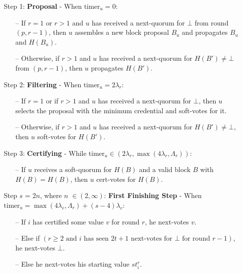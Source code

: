 \documentclass{article}
\begin{document}
    \begin{enumerate}

        \item[] Step 1: \textbf{Proposal} - When $\text{timer}_u = 0$:
        \begin{itemize}
            \item[--] If $r = 1$ or $r > 1$ and $u$ has received a next-quorum for $\bot$ from round $(p, r - 1)$, then $u$ assembles a new block proposal $B_u$ and propagates $B_u$ and $H(B_u)$.
            \item[--] Otherwise, if $r > 1$ and $u$ has received a next-quorum for $H(B') \neq \bot$ from $(p, r-1)$, then $u$ propagates $H(B')$.
        \end{itemize}

        \item[] Step 2: \textbf{Filtering} - When $\text{timer}_u = 2\lambda_r$:
        \begin{itemize}
            \item[--] If $r = 1$ or if $r > 1$ and $u$ has received a next-quorum for $\bot$, then $u$ selects the proposal with the minimum credential and soft-votes for it.
            \item[--] Otherwise, if $r > 1$ and $u$ has received a next-quorum for $H(B') \neq \bot$, then $u$ soft-votes for $H(B')$.
        \end{itemize}

        \item[] Step 3: \textbf{Certifying} - While $\text{timer}_u \in (2\lambda_r, \max(4\lambda_r, \Lambda_r))$:
        \begin{itemize}
            \item[--] If $u$ receives a soft-quorum for $H(B)$ and a valid block $B$ with $H(B) = H(B)$, then $u$ cert-votes for $H(B)$.
        \end{itemize}

        \item[] Step $s$ = 2$n$, where $n$ $\in (2, \infty)$: \textbf{First Finishing Step} - When $\text{timer}_u = \max(4\lambda_r, \Lambda_r) + (s-4)\lambda_r$:
        \begin{itemize}
            \item[--] If $i$ has certified some value $v$ for round $r$, he next-votes $v$.
            \item[--] Else if $(r \geq 2 \text{ and } i \text{ has seen } 2t+1 \text{ next-votes for } \bot \text{ for round } r-1)$, he next-votes $\bot$.
            \item[--] Else he next-votes his starting value $st^r_i$.
        \end{itemize}


\end{enumerate}
\end{document}
